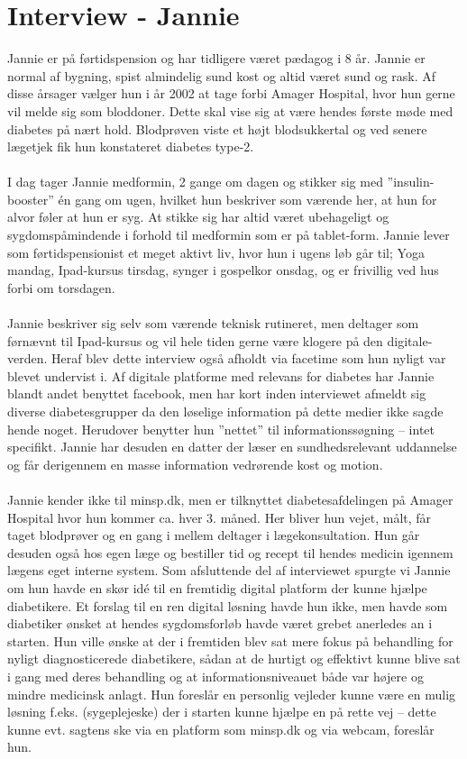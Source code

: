 \section{Interview - Jannie}
Jannie er på førtidspension og har tidligere været pædagog i 8 år. Jannie er normal af bygning, spist almindelig sund kost og altid været sund og rask. Af disse årsager vælger hun i år 2002 at tage forbi Amager Hospital, hvor hun gerne vil melde sig som bloddoner. Dette skal vise sig at være hendes første møde med diabetes på nært hold. Blodprøven viste et højt blodsukkertal og ved senere lægetjek fik hun konstateret diabetes type-2.
\\ \\
I dag tager Jannie medformin, 2 gange om dagen og stikker sig med ”insulin-booster” én gang om ugen, hvilket hun beskriver som værende her, at hun for alvor føler at hun er syg. At stikke sig har altid været ubehageligt og sygdomspåmindende i forhold til medformin som er på tablet-form. Jannie lever som førtidspensionist et meget aktivt liv, hvor hun i ugens løb går til; Yoga mandag, Ipad-kursus tirsdag, synger i gospelkor onsdag, og er frivillig ved hus forbi om torsdagen.
\\ \\
Jannie beskriver sig selv som værende teknisk rutineret, men deltager som førnævnt til Ipad-kursus og vil hele tiden gerne være klogere på den digitale-verden. Heraf blev dette interview også afholdt via facetime som hun nyligt var blevet undervist i. Af digitale platforme med relevans for diabetes har Jannie blandt andet benyttet facebook, men har kort inden interviewet afmeldt sig diverse diabetesgrupper da den løselige information på dette medier ikke sagde hende noget. Herudover benytter hun ”nettet” til informationssøgning – intet specifikt. Jannie har desuden en datter der læser en sundhedsrelevant uddannelse og får derigennem en masse information vedrørende kost og motion.
\\ \\
Jannie kender ikke til minsp.dk, men er tilknyttet diabetesafdelingen på Amager Hospital hvor hun kommer ca. hver 3. måned. Her bliver hun vejet, målt, får taget blodprøver og en gang i mellem deltager i lægekonsultation. Hun går desuden også hos egen læge og bestiller tid og recept til hendes medicin igennem lægens eget interne system.
Som afsluttende del af interviewet spurgte vi Jannie om hun havde en skør idé til en fremtidig digital platform der kunne hjælpe diabetikere. Et forslag til en ren digital løsning havde hun ikke, men havde som diabetiker ønsket at hendes sygdomsforløb havde været grebet anerledes an i starten. Hun ville ønske at der i fremtiden blev sat mere fokus på behandling for nyligt diagnosticerede diabetikere, sådan at de hurtigt og effektivt kunne blive sat i gang med deres behandling og at informationsniveauet både var højere og mindre medicinsk anlagt. Hun foreslår en personlig vejleder kunne være en mulig løsning f.eks. (sygeplejeske) der i starten kunne hjælpe en på rette vej – dette kunne evt. sagtens ske via en platform som minsp.dk og via webcam, foreslår hun.

